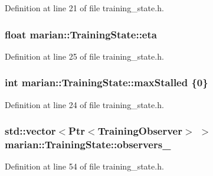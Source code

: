 Definition at line 21 of file training\+\_\+state.\+h.

\subsubsection[{\texorpdfstring{eta}{eta}}]{\setlength{\rightskip}{0pt plus 5cm}float marian\+::\+Training\+State\+::eta}\hypertarget{classmarian_1_1TrainingState_ae8adecdd9040fc08d1fe0dfdc27aabbe}{}\label{classmarian_1_1TrainingState_ae8adecdd9040fc08d1fe0dfdc27aabbe}


Definition at line 25 of file training\+\_\+state.\+h.

\subsubsection[{\texorpdfstring{max\+Stalled}{maxStalled}}]{\setlength{\rightskip}{0pt plus 5cm}int marian\+::\+Training\+State\+::max\+Stalled \{0\}}\hypertarget{classmarian_1_1TrainingState_a7ff30779aa3ac9b66118a64211cab7fd}{}\label{classmarian_1_1TrainingState_a7ff30779aa3ac9b66118a64211cab7fd}


Definition at line 24 of file training\+\_\+state.\+h.

\subsubsection[{\texorpdfstring{observers\+\_\+}{observers_}}]{\setlength{\rightskip}{0pt plus 5cm}std\+::vector$<${\bf Ptr}$<${\bf Training\+Observer}$>$ $>$ marian\+::\+Training\+State\+::observers\+\_\+\hspace{0.3cm}{\ttfamily [private]}}\hypertarget{classmarian_1_1TrainingState_a2ed373fb68e74a5c1889b5f7dcccfa2e}{}\label{classmarian_1_1TrainingState_a2ed373fb68e74a5c1889b5f7dcccfa2e}


Definition at line 54 of file training\+\_\+state.\+h.

